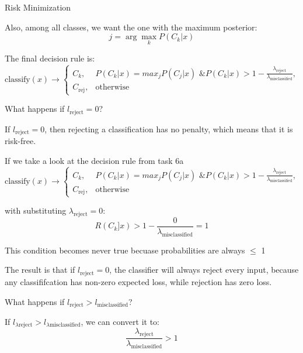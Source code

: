\documentclass[
	english,
        solution=true
	]{tudaexercise}
\begin{document}
\begin{task}[points=11]{Risk Minimization}
\begin{subtask}[points=3]
\begin{solution}
Also, among all classes, we want the one with the maximum posterior:
\[
j = \arg \max_k P(C_k | x)
\]

The final decision rule is:
\[
\text{classify}(x) \to \begin{cases}
C_k, & {P(C_k | x ) = max_j P(C_j | x) \text{ \& }  P(C_k | x ) > 1 - \frac{\lambda_\text{reject}}{\lambda_\text{misclassified}}}, \\
C_{\text{rej}}, & \text{otherwise}
\end{cases}
\]

\end{solution}
\end{subtask}

\vspace{2em}

\begin{subtask}[points=2]
What happens if $l_{\text{reject}} = 0$?

\begin{solution}
If $l_{\text{reject}} = 0$, then rejecting a classification has no penalty, which means that it is risk-free.

If we take a look at the decision rule from task 6a
\[
\text{classify}(x) \to \begin{cases}
C_k, & {P(C_k | x ) = max_j P(C_j | x) \text{ \& }  P(C_k | x ) > 1 - \frac{\lambda_\text{reject}}{\lambda_\text{misclassified}}}, \\
C_{\text{rej}}, & \text{otherwise}
\end{cases}
\]

with substituting $\lambda_{\text{reject}} = 0$:
\[
R(C_k ] x ) > 1 - \frac{0}{\lambda_\text{misclassified}} = 1
\]

This condition becomes never true becuase probabilities are always $\leq$ 1

The result is that if $l_{\text{reject}} = 0$, the classifier will always reject every input, because any classififcation has non-zero expected loss, while rejection has zero loss.

\end{solution} 
\end{subtask}

\vspace{2em}
\begin{subtask}[points=1]

 What happens if $l_{\text{reject}} > l_{\text{misclassified}}$? 

\begin{solution}
If $l_{\lambda{\text{reject}}} > l_{\lambda{\text{misclassified}}}$, we can convert it to:
\[
\frac{\lambda_\text{reject}}{\lambda_\text{misclassified}} > 1
\]


\end{solution}
\end{subtask}
\end{task}
\end{document}

